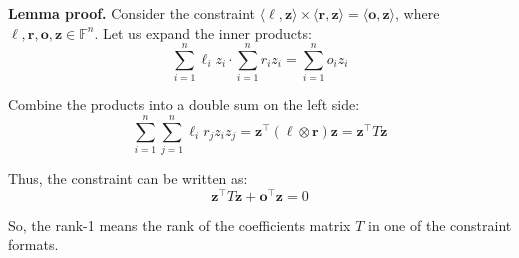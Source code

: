 \documentclass[../lecture-notes-148x210.tex]{subfiles}
\begin{document}
\textbf{Lemma proof.} Consider the constraint $\langle \boldsymbol{\ell},
\mathbf{z}\rangle \times \langle \boldsymbol{r}, \mathbf{z}\rangle = \langle
\boldsymbol{o}, \mathbf{z}\rangle$, where $\boldsymbol{\ell}, \boldsymbol{r}, \boldsymbol{o},
\mathbf{z} \in \mathbb{F}^n$. Let us expand the inner products: 
\[ \sum_{i=1}^{n} \ell_i z_i \cdot \sum_{i=1}^{n} r_i z_i = \sum_{i=1}^{n} o_i z_i \]

Combine the products into a double sum on the left side:
\[ \sum_{i=1}^{n} \sum_{j=1}^{n} \ell_i r_j z_i z_j = \mathbf{z}^{\top} (\boldsymbol{\ell} \otimes \boldsymbol{r}) \mathbf{z} = \mathbf{z}^{\top} T \mathbf{z} \]

Thus, the constraint can be written as:
\[ \mathbf{z}^{\top} T \mathbf{z} + \boldsymbol{o}^{\top} \mathbf{z} = 0 \]

So, the rank-1 means the rank of the coefficients matrix $T$ in one of the constraint formats.
\end{document}
